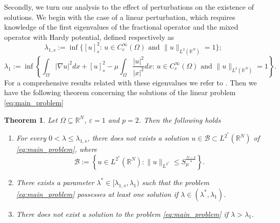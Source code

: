 \documentclass[11pt]{article}
\newtheorem{theorem}{Theorem}[section] %
\newcommand{\om} {\Omega}
\newcommand{\rnn}{\mathbb{R}^{N}}
\newcommand{\grad}{\nabla}
\begin{document}
Secondly, we turn our analysis to the effect of perturbations on the existence of solutions. We begin with the case of a linear perturbation, which requires knowledge of the first eigenvalues of the fractional operator and the mixed operator with Hardy potential, defined respectively as
\begin{equation} \label{eq:first_eigenvalue_frac}
   \lambda_{1,s} := 
  \inf\big\{[u]^2_s:\,\text{$u\in C_c^\infty(\Omega)$ and $\|u\|_{L^2(\rnn)} = 1$}\big\};
\end{equation}
\begin{equation} \label{eq:first_eigenvalue}
\lambda_{1} := 
  \inf\left\{ \int_{\om} |\grad u|^2 dx + [u]_s^2 - \mu \int_{\om}\frac{|u|^2}{|x|^2}dx:\,\text{$u\in C_c^\infty(\Omega)$ and $\|u\|_{L^2(\rnn)} = 1$}\right\}.
\end{equation}
For a comprehensive results related with these eigenvalues we refer to \cite[Remark $4.4$]{biagi2022brezis}. Then we have the following theorem concerning the solutions of the linear problem \eqref{eq:main_problem}
\begin{theorem}\label{thm:existence_linear_case}
Let $\Omega \subseteq \mathbb{R}^N$, $\varepsilon = 1$ and $p = 2$. Then the following holds
\begin{enumerate}
    \item For every $0 < \lambda \leq \lambda_{1, s}$, there does not exists a solution $u \in \mathcal{B} \subset L^{2^*}(\mathbb{R}^N)$ of \eqref{eq:main_problem}, where
    \begin{equation}\label{eq:linear_ball_NE}
    \mathcal{B} := \left\{ u \in L^{2^*}(\mathbb{R}^N) : \| u \|_{L^{2^*}} \leq  S_{\mu}^{\frac{N-2}{4}} \right\}.
    \end{equation}
    \item There exists a parameter $\lambda^* \in [\lambda_{1, s}, \lambda_1)$ such that the problem \eqref{eq:main_problem} possesses at least one solution if $\lambda \in (\lambda^*, \lambda_1)$. 
    \item There does not exist a solution to the problem \eqref{eq:main_problem} if $\lambda > \lambda_1$.
\end{enumerate}
\end{theorem}
\end{document}
